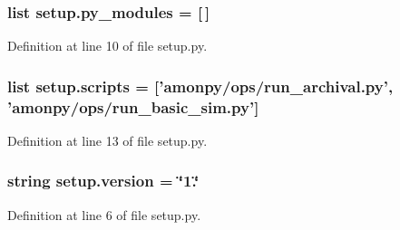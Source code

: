 \hypertarget{namespacesetup_a2f17d3b44c4dab5ffba788f40bf1397a}{
\subsubsection[{py\-\_\-modules}]{\setlength{\rightskip}{0pt plus 5cm}list setup.\-py\-\_\-modules = \mbox{[}$\,$\mbox{]}}}\label{namespacesetup_a2f17d3b44c4dab5ffba788f40bf1397a}


Definition at line 10 of file setup.\-py.

\hypertarget{namespacesetup_ac1f45f8d37050b278bf63c812b1130dd}{
\subsubsection[{scripts}]{\setlength{\rightskip}{0pt plus 5cm}list setup.\-scripts = \mbox{[}'amonpy/ops/run\-\_\-archival.\-py', 'amonpy/ops/run\-\_\-basic\-\_\-sim.\-py'\mbox{]}}}\label{namespacesetup_ac1f45f8d37050b278bf63c812b1130dd}


Definition at line 13 of file setup.\-py.

\hypertarget{namespacesetup_ab177531e7a80674a3db3de2d79eb8be7}{
\subsubsection[{version}]{\setlength{\rightskip}{0pt plus 5cm}string setup.\-version = \char`\"{}1.\char`\"{}}}\label{namespacesetup_ab177531e7a80674a3db3de2d79eb8be7}


Definition at line 6 of file setup.\-py.

